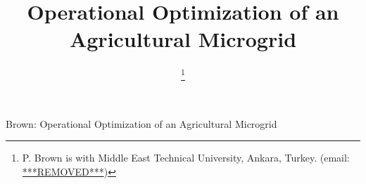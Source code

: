 \title{Operational Optimization of an Agricultural Microgrid}

\author{%
  \thanks{P. Brown is with Middle East Technical University, Ankara, Turkey.
  (email: \href{mailto:***REMOVED***}{***REMOVED***})}
}

%
{{Brown}: Operational Optimization of an Agricultural Microgrid}